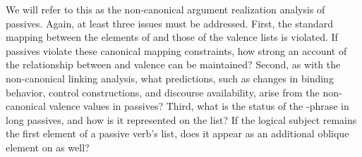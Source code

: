 \documentclass[output=paper
 	        ,biblatex
                ,babelshorthands
                ,newtxmath
                ,draftmode
                ,colorlinks, citecolor=brown
]{langscibook}
\begin{document}

We will refer to this as the non-canonical argument realization analysis of passives. Again, at least three 
issues must be addressed.
First, the standard mapping between the elements of \argst and those of the valence lists is violated.
If passives violate these canonical mapping constraints, how strong an account of the relationship between \argst and valence can be maintained?
Second, as with the non-canonical linking analysis, what predictions, such as changes in binding behavior, control constructions, and discourse availability, arise from the non-canonical valence values in passives?
Third, what is the status of the -phrase in long passives, and how is it represented on the \argst list?  If the logical subject remains the first element of a passive verb's \argst list, does it appear as an additional oblique element on \argst as well? 
\end{document}
